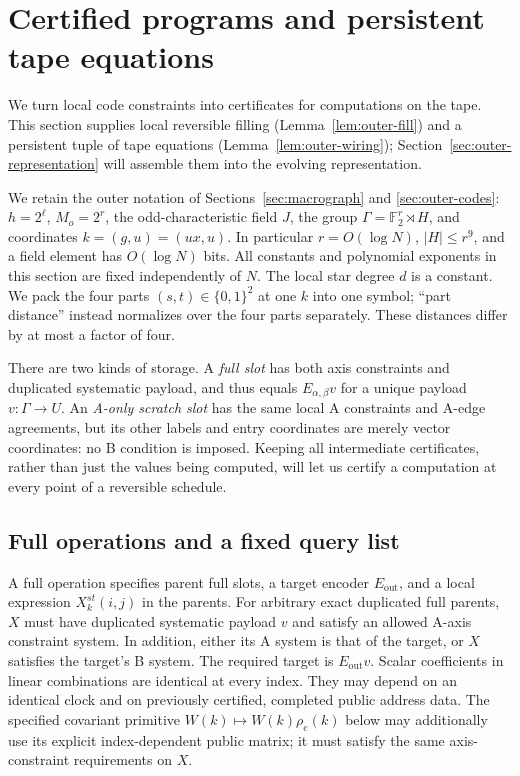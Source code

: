 \section{Certified programs and persistent tape equations}\label{sec:outer-programs}

We turn local code constraints into certificates for computations on the
tape. This section supplies local reversible filling
(Lemma~\ref{lem:outer-fill}) and a persistent tuple of tape equations
(Lemma~\ref{lem:outer-wiring}); Section~\ref{sec:outer-representation}
will assemble them into the evolving representation.

We retain the outer notation of Sections~\ref{sec:macrograph} and
\ref{sec:outer-codes}: $h=2^\ell$, $M_o=2^r$, the odd-characteristic
field $J$, the group $\Gamma=\mathbb F_2^r\rtimes H$, and coordinates
$k=(g,u)=(ux,u)$.  In particular $r=O(\log N)$,
$|H|\le r^9$, and a field element has $O(\log N)$ bits.
All constants and polynomial exponents in this section are fixed
independently of $N$.  The local star degree $d$ is a constant.
We pack the four parts $(s,t)\in\{0,1\}^2$ at one $k$ into one symbol;
``part distance'' instead normalizes over the four parts separately.
These distances differ by at most a factor of four.

There are two kinds of storage.  A \emph{full slot} has both axis
constraints and duplicated systematic payload, and thus equals
$E_{\alpha,\beta}v$ for a unique payload $v:\Gamma\to U$.
An \emph{A-only scratch slot} has the same local A constraints and
A-edge agreements, but its other labels and entry coordinates are
merely vector coordinates: no B condition is imposed.  Keeping all
intermediate certificates, rather than just the values being computed,
will let us certify a computation at every point of a reversible schedule.

\subsection{Full operations and a fixed query list}

\begin{definition}\label{op:full-operation}
A full operation specifies parent full slots, a target encoder
$E_{\mathrm{out}}$, and a local expression $X^{st}_k(i,j)$ in the parents.
For arbitrary exact duplicated full parents, $X$ must have duplicated
systematic payload $v$ and satisfy an allowed A-axis constraint system.
In addition, either its A system is that of the target, or $X$ satisfies
the target's B system.  The required target is $E_{\mathrm{out}}v$.
Scalar coefficients in linear combinations are identical at every
index.  They may depend on an identical clock and on previously
certified, completed public address data.  The specified covariant
primitive $W(k)\mapsto W(k)\rho_e(k)$ below may additionally use its
explicit index-dependent public matrix; it must satisfy the same
axis-constraint requirements on $X$.
\end{definition}

